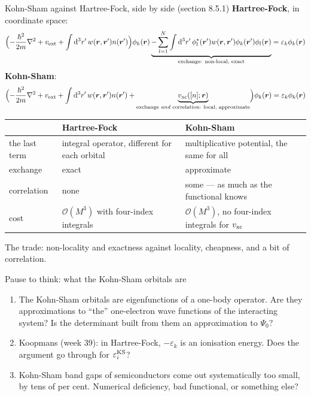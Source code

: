 \documentclass[aspectratio=169,10pt]{beamer}
\newcounter{thinkctr}
\newcommand{\thinkq}[2]{%
  \stepcounter{thinkctr}%
  \vfill
  \begin{tcolorbox}[enhanced,colback=palewarm,colframe=warm,boxrule=1.2pt,arc=4pt,
    grow to left by=6mm,grow to right by=6mm,
    left=16pt,right=16pt,top=16pt,bottom=18pt,
    fonttitle=\bfseries\Large,fontupper=\Large,
    title={Pause to think \#\thethinkctr\hfill\mdseries\normalsize(about #1 min -- discuss with your neighbour)}]
  #2
  \end{tcolorbox}
  \vfill}
\newcommand{\bigO}{\mathcal{O}}
\newcommand{\dd}{\mathrm{d}}
\begin{document}
\begin{frame}{Kohn-Sham against Hartree-Fock, side by side (section 8.5.1)}
  \small
  \textbf{Hartree-Fock}, in coordinate space:
  \[
    \Bigl(-\frac{\hbar^2}{2m}\nabla^2+v_{\rm ext}+\int\dd^3r'\,w(\bm r,\bm r')n(\bm r')\Bigr)\phi_k(\bm r)
    \underbrace{-\sum_{l=1}^N\int\dd^3r'\,\phi_l^{*}(\bm r')w(\bm r,\bm r')\phi_k(\bm r')\phi_l(\bm r)}_{\text{exchange: non-local, exact}}
    =\varepsilon_k\phi_k(\bm r)
  \]
  \textbf{Kohn-Sham}:
  \[
    \Bigl(-\frac{\hbar^2}{2m}\nabla^2+v_{\rm ext}+\int\dd^3r'\,w(\bm r,\bm r')n(\bm r')
    +\underbrace{v_{\rm xc}([n];\bm r)}_{\text{exchange \emph{and} correlation: local, approximate}}\Bigr)\phi_k(\bm r)=\varepsilon_k\phi_k(\bm r)
  \]
  \begin{center}\small
  \begin{tabular}{@{}lll@{}}\toprule
   & Hartree-Fock & Kohn-Sham\\\midrule
  the last term & integral operator, different for each orbital & multiplicative potential, the same for all\\
  exchange & exact & approximate\\
  correlation & none & some --- as much as the functional knows\\
  cost & $\bigO(M^3)$ with four-index integrals & $\bigO(M^3)$, no four-index integrals for $v_{\rm xc}$\\\bottomrule
  \end{tabular}
  \end{center}
  \centering The trade: non-locality and exactness against locality, cheapness, and a bit of correlation.
\end{frame}

\begin{frame}{Pause to think: what the Kohn-Sham orbitals are}
  \thinkq{4}{
  \begin{enumerate}
    \item The Kohn-Sham orbitals are eigenfunctions of a one-body operator. Are they approximations to ``the'' one-electron wave functions of the interacting system? Is the determinant built from them an approximation to $\Psi_0$?
    \item Koopmans (week 39): in Hartree-Fock, $-\varepsilon_k$ is an ionisation energy. Does the argument go through for $\varepsilon_i^{\rm KS}$?
    \item Kohn-Sham band gaps of semiconductors come out systematically too small, by tens of per cent. Numerical deficiency, bad functional, or something else?
  \end{enumerate}}
\end{frame}
\end{document}
